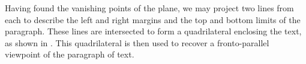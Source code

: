 












Having found the vanishing points of the plane, we may project two lines from each
to describe the left and right margins and the top and bottom limits of the paragraph.
These lines are intersected to form a quadrilateral enclosing the text,
as shown in . %
This quadrilateral is then used to recover a fronto-parallel viewpoint
of the paragraph of text.


